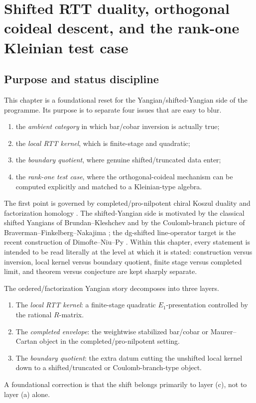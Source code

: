 
\chapter{Shifted RTT duality, orthogonal coideal descent, and the rank-one Kleinian test case}
\label{chap:shifted-rtt-orthogonal-coideals}

\section{Purpose and status discipline}
\label{sec:purpose-status-discipline}

This chapter is a foundational reset for the Yangian/shifted-Yangian side of the
programme.  Its purpose is to separate four issues that are easy to blur.

\begin{enumerate}[label=\textup{(\roman*)}]
\item the \emph{ambient category} in which bar/cobar inversion is actually true;
\item the \emph{local RTT kernel}, which is finite-stage and quadratic;
\item the \emph{boundary quotient}, where genuine shifted/truncated data enter;
\item the \emph{rank-one test case}, where the orthogonal-coideal mechanism can
  be computed explicitly and matched to a Kleinian-type algebra.
\end{enumerate}

The first point is governed by completed/pro-nilpotent chiral Koszul duality and
factorization homology \cite{FG12,AF15,AF20}.  The shifted-Yangian side is
motivated by the classical shifted Yangians of Brundan--Kleshchev and by the
Coulomb-branch picture of Braverman--Finkelberg--Nakajima
\cite{BrunKlesh06,BFN18}; the dg-shifted line-operator target is the recent
construction of Dimofte--Niu--Py \cite{DNP25}.  Within this chapter, every
statement is intended to be read literally at the level at which it is stated:
construction versus inversion, local kernel versus boundary quotient, finite
stage versus completed limit, and theorem versus conjecture are kept sharply
separate.

\begin{definition}
\label{def:three-layers-ordered-theory-appendix}
The ordered/factorization Yangian story decomposes into three layers.
\begin{enumerate}[label=\textup{(\alph*)}]
\item The \emph{local RTT kernel}: a finite-stage quadratic $E_1$-presentation
  controlled by the rational $R$-matrix.
\item The \emph{completed envelope}: the weightwise stabilized bar/cobar or
  Maurer--Cartan object in the completed/pro-nilpotent setting.
\item The \emph{boundary quotient}: the extra datum cutting the unshifted local
  kernel down to a shifted/truncated or Coulomb-branch-type object.
\end{enumerate}
A foundational correction is that the shift belongs primarily to layer
\textup{(c)}, not to layer \textup{(a)} alone.
\end{definition}

